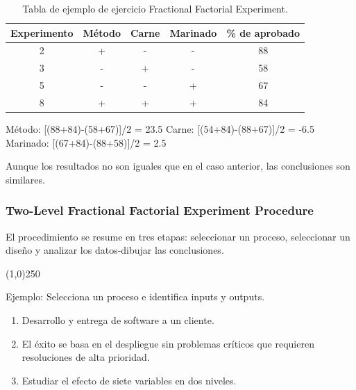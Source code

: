 \documentclass[]{article}
\begin{document}
\begin{table}[H]
	\begin{center}
		\begin{tabular}{|c|c|c|c|c|}
			\hline Experimento & Método & Carne & Marinado & \% de aprobado \\ 
			\hline 2 & + & - & - & 88 \\ 
			\hline 3 & - & + & - & 58 \\ 
			\hline 5 & - & - & + & 67 \\ 
			\hline 8 & + & + & + & 84 \\ 
			\hline 
		\end{tabular} 
		\caption{Tabla de ejemplo de ejercicio Fractional Factorial Experiment.}
	\end{center}
\end{table}

Método: [(88+84)-(58+67)]/2 = 23.5 \newline
Carne: [(54+84)-(88+67)]/2 = -6.5 \newline
Marinado: [(67+84)-(88+58)]/2 = 2.5 

Aunque los resultados no son iguales que en el caso anterior, las conclusiones son similares.

\subsubsection{Two-Level Fractional Factorial Experiment Procedure}

El procedimiento se resume en tres etapas: seleccionar un proceso, seleccionar un diseño y analizar los datos-dibujar las conclusiones.

\begin{center}
	\line(1,0){250}
\end{center}


Ejemplo:
Selecciona un proceso e identifica inputs y outputs.
\begin{enumerate}
	\item Desarrollo y entrega de software a un cliente.
	\item El éxito se basa en el despliegue sin problemas críticos que requieren resoluciones de alta prioridad.
	\item Estudiar el efecto de siete variables en dos niveles.
\end{enumerate}
\end{document}
